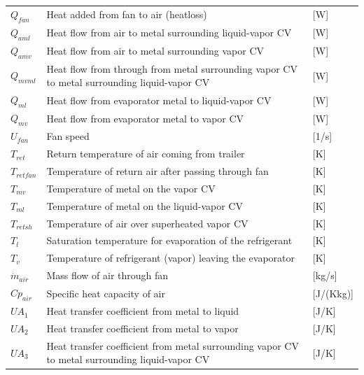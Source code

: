 \begin{center}
	\begin{tabular}{l p{10cm} l}
		$Q_{fan}$			& Heat added from fan to air (heatloss)			& [\si{W}] \\	
		$Q_{aml}$			& Heat flow from air to metal surrounding liquid-vapor CV			& [\si{W}] \\	
		$Q_{amv}$			& Heat flow from air to metal surrounding vapor CV			& [\si{W}] \\		
		$Q_{mvml}$			& Heat flow from through from metal surrounding vapor CV to metal surrounding liquid-vapor CV			& [\si{W}] \\	
		$Q_{ml}$			& Heat flow from evaporator metal to liquid-vapor CV			& [\si{W}] \\	
		$Q_{mv}$			& Heat flow from evaporator metal to vapor CV					& [\si{W}] \\			
		$U_{fan}$			& Fan speed 	& [1/\si{s}]\\
		$T_{ret}$			& Return temperature of air coming from trailer 			& [\si{K}] \\		
		$T_{retfan}$		& Temperature of return air after passing through fan			& [\si{K}] \\		
		$T_{mv}$			& Temperature of metal on the vapor CV			& [\si{K}] \\
		$T_{ml}$			& Temperature of metal on the liquid-vapor CV			& [\si{K}] \\
		$T_{retsh}$			& Temperature of air over superheated vapor CV			& [\si{K}] \\
		$T_{l}$				& Saturation temperature for evaporation of the refrigerant			& [\si{K}] \\	
		$T_{v}$				& Temperature of refrigerant (vapor) leaving the evaporator		& [\si{K}] \\		
		$\dot{m}_{air}$		& Mass flow of air through fan			& [\si{kg}/\si{s}] \\		
		$Cp_{air}$			& Specific heat capacity of air			& [\si{J}/(\si{K}\si{kg})] \\	
		$UA_1$				& Heat transfer coefficient from metal to liquid			& [\si{J}/\si{K}] \\
		$UA_2$				& Heat transfer coefficient from metal to vapor			& [\si{J}/\si{K}] \\
		$UA_3$				& Heat transfer coefficient from metal surrounding vapor CV to metal surrounding liquid-vapor CV			& [\si{J}/\si{K}] \\
	\end{tabular}
\end{center}

